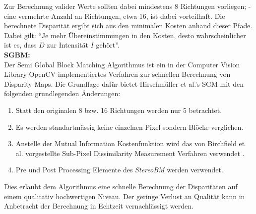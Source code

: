 \noindent
Zur Berechnung valider Werte sollten dabei mindestens 8 Richtungen vorliegen; -  eine vermehrte Anzahl an Richtungen, etwa 16, ist dabei vorteilhaft. Die berechnete Disparität ergibt sich aus den minimalen Kosten anhand dieser Pfade. Dabei gilt: “Je mehr Übereinstimmungen in den Kosten, desto wahrscheinlicher ist es, dass $D$ zur Intensität $I$ gehört”.\\

\noindent
\textbf{SGBM:} \\
Der Semi Global Block Matching Algorithmus ist ein in der Computer Vision Library OpenCV implementiertes Verfahren zur schnellen Berechnung von Disparity Maps. Die Grundlage dafür bietet Hirschmüller et al.’s SGM \cite{hirschmueller2008sgm} mit den folgenden grundlegenden Änderungen:

\begin{enumerate}[label=C.\arabic*]
	\item Statt den originalen 8 bzw. 16 Richtungen werden nur 5 betrachtet. \label{item:differences_directions}
	\item Es werden  standartm\"assig keine einzelnen Pixel sondern Blöcke verglichen. \label{item:differences_matching}
	\item Anstelle der Mutual Information Kostenfunktion wird das von Birchfield et al. vorgestellte Sub-Pixel Dissimilarity Measurement Verfahren verwendet \cite{birchfield-tomasi}.
	\item Pre und Post Processing Elemente des \emph{StereoBM} \cite{opencv_doc} werden verwendet.
\end{enumerate}

\noindent
Dies erlaubt dem Algorithmus eine schnelle Berechnung der Disparitäten auf einem qualitativ hochwertigen Niveau. Der geringe Verlust an Qualität kann in Anbetracht der Berechnung in Echtzeit vernachlässigt werden.

